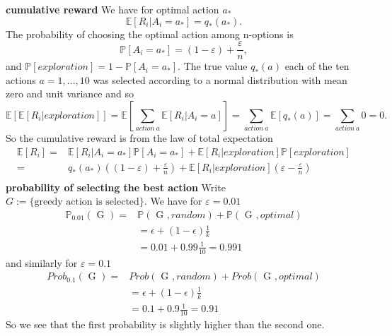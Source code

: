 \documentclass[answers]{exam}
\theoremstyle{definition}
\theoremstyle{remark}
\newcommand{\Prob}{\mathbb{P}}
\newcommand{\Proba}[1]{\mathbb{P}\left[#1\right]}
\newcommand{\Expe}[1]{\mathbb{E}\left[ #1\right] }
\newcommand{\e}{\varepsilon}
\begin{document}
\begin{solution}
    
\textbf{ cumulative reward}
We have for optimal action $a_{*}$
\begin{equation}
\Expe{R_{i}|A_{i}=a_{*}}=q_{*}(a_{*}).    
\end{equation}
The probability of choosing the optimal action among n-options is
\begin{equation}
\Proba{A_{i}=a_{*}}=(1-\e)+\frac{\e}{n},
\end{equation}
and $\Proba{exploration}=1- \Proba{A_{i}=a_{*}}$. The true value $q_{*}(a)$ each of the ten actions $a=1,...,10$ was selected according to a normal distribution with mean zero and unit variance and so
\begin{equation}
\Expe{\Expe{R_{i}|exploration}}=\Expe{\sum_{action~a}\Expe{R_{i}|A_{i}=a}} =\sum_{action~a}\Expe{q_{*}(a)}=\sum_{action~a}0=0.   
\end{equation}
So the cumulative reward is from the law of total expectation
\begin{align*}
\Expe{R_{i}}=&\Expe{R_{i}|A_{i}=a_{*}}\Proba{A_{i}=a_{*}}+\Expe{R_{i}|exploration}\Proba{exploration}\\    
=&q_{*}(a_{*})((1-\e)+\frac{\e}{n})+\Expe{R_{i}|exploration}(\e-\frac{\e}{n})\\    
\end{align*}
\textbf{probability of selecting the best action}
Write $G:=\{\text{greedy action is selected}\}$. We have for $\e=0.01$
\begin{align*}
\Prob_{0.01}(\text{ G })=&\Prob(\text{ G },random)+\Prob(\text{ G },optimal)    \\
&=\epsilon+(1-\epsilon)\frac{1}{k}\\
&=0.01+0.99\frac{1}{10}=0.991
\end{align*}  
and similarly for $\e=0.1$
\begin{align*}
Prob_{0.1}(\text{ G })=&Prob(\text{ G },random)+Prob(\text{ G },optimal)    \\
&=\epsilon+(1-\epsilon)\frac{1}{k}\\
&=0.1+0.9\frac{1}{10}=0.91
\end{align*}  
So we see that the first probability is slightly higher than the second one.



\end{solution}
\end{document}
